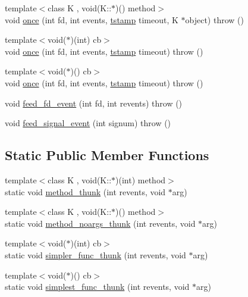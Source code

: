 \begin{DoxyCompactItemize}
{\footnotesize template$<$class K , void(\-K\-::$\ast$)() method$>$ }\\void \hyperlink{structev_1_1loop__ref_aecce9953b684e4b8db13b3a9d82520ca}{once} (int fd, int events, \hyperlink{namespaceev_a9853823b701944a8a5ce179d10a24b97}{tstamp} timeout, \-K $\ast$object)  throw ()
\item 
{\footnotesize template$<$void($\ast$)(int) cb$>$ }\\void \hyperlink{structev_1_1loop__ref_a5a68aa8f7554b9aab364abce41180d84}{once} (int fd, int events, \hyperlink{namespaceev_a9853823b701944a8a5ce179d10a24b97}{tstamp} timeout)  throw ()
\item 
{\footnotesize template$<$void($\ast$)() cb$>$ }\\void \hyperlink{structev_1_1loop__ref_a5a68aa8f7554b9aab364abce41180d84}{once} (int fd, int events, \hyperlink{namespaceev_a9853823b701944a8a5ce179d10a24b97}{tstamp} timeout)  throw ()
\item 
void \hyperlink{structev_1_1loop__ref_a583fb6668c11d14b9e9a5495b5664656}{feed\-\_\-fd\-\_\-event} (int fd, int revents)  throw ()
\item 
void \hyperlink{structev_1_1loop__ref_ab64972f5cac053e4f240d8cb3bace62e}{feed\-\_\-signal\-\_\-event} (int signum)  throw ()
\end{DoxyCompactItemize}
\subsection*{\-Static \-Public \-Member \-Functions}
\begin{DoxyCompactItemize}
\item 
{\footnotesize template$<$class K , void(\-K\-::$\ast$)(int) method$>$ }\\static void \hyperlink{structev_1_1loop__ref_a2eb69b009eb6f3f2a7dc4c0228acae47}{method\-\_\-thunk} (int revents, void $\ast$arg)
\item 
{\footnotesize template$<$class K , void(\-K\-::$\ast$)() method$>$ }\\static void \hyperlink{structev_1_1loop__ref_a0e7541afccf795b86f16d22b3b70ea60}{method\-\_\-noargs\-\_\-thunk} (int revents, void $\ast$arg)
\item 
{\footnotesize template$<$void($\ast$)(int) cb$>$ }\\static void \hyperlink{structev_1_1loop__ref_a5f709bebce00398bdfb96a55fecb43c9}{simpler\-\_\-func\-\_\-thunk} (int revents, void $\ast$arg)
\item 
{\footnotesize template$<$void($\ast$)() cb$>$ }\\static void \hyperlink{structev_1_1loop__ref_a40790ea6f443c6f410c35f4c252c2079}{simplest\-\_\-func\-\_\-thunk} (int revents, void $\ast$arg)
\end{DoxyCompactItemize}
